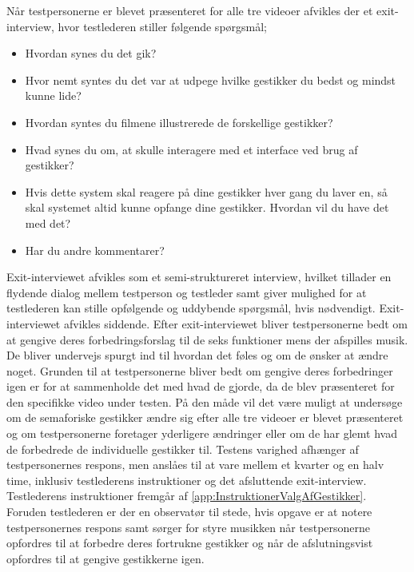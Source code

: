 Når testpersonerne er blevet præsenteret for alle tre videoer afvikles der et exit-interview, hvor testlederen stiller følgende spørgsmål; \blankline
%
\begin{itemize}
  \item Hvordan synes du det gik? 
  \item Hvor nemt syntes du det var at udpege hvilke gestikker du bedst og mindst kunne lide? 
  \item Hvordan syntes du filmene illustrerede de forskellige gestikker? 
  \item Hvad synes du om, at skulle interagere med et interface ved brug af gestikker? 
  \item Hvis dette system skal reagere på dine gestikker hver gang du laver en, så skal systemet altid kunne opfange dine gestikker. Hvordan vil du have det med det? 
  \item Har du andre kommentarer?\blankline
\end{itemize}
\noindent
%
Exit-interviewet afvikles som et semi-struktureret interview, hvilket tillader en flydende dialog mellem testperson og testleder samt giver mulighed for at testlederen kan stille opfølgende og uddybende spørgsmål, hvis nødvendigt. Exit-interviewet afvikles siddende. Efter exit-interviewet bliver testpersonerne bedt om at gengive deres forbedringsforslag til de seks funktioner mens der afspilles musik. De bliver undervejs spurgt ind til hvordan det føles og om de ønsker at ændre noget. Grunden til at testpersonerne bliver bedt om gengive deres forbedringer igen er for at sammenholde det med hvad de gjorde, da de blev præsenteret for den specifikke video under testen. På den måde vil det være muligt at undersøge om de semaforiske gestikker ændre sig efter alle tre videoer er blevet præsenteret og om testpersonerne foretager yderligere ændringer eller om de har glemt hvad de forbedrede de individuelle gestikker til. \blankline   
%
Testens varighed afhænger af testpersonernes respons, men anslåes til at vare mellem et kvarter og en halv time, inklusiv testlederens instruktioner og det afsluttende exit-interview. Testlederens instruktioner fremgår af \autoref{app:InstruktionerValgAfGestikker}. Foruden testlederen er der en observatør til stede, hvis opgave er at notere testpersonernes respons samt sørger for styre musikken når testpersonerne opfordres til at forbedre deres fortrukne gestikker og når de afslutningsvist opfordres til at gengive gestikkerne igen. 
%
